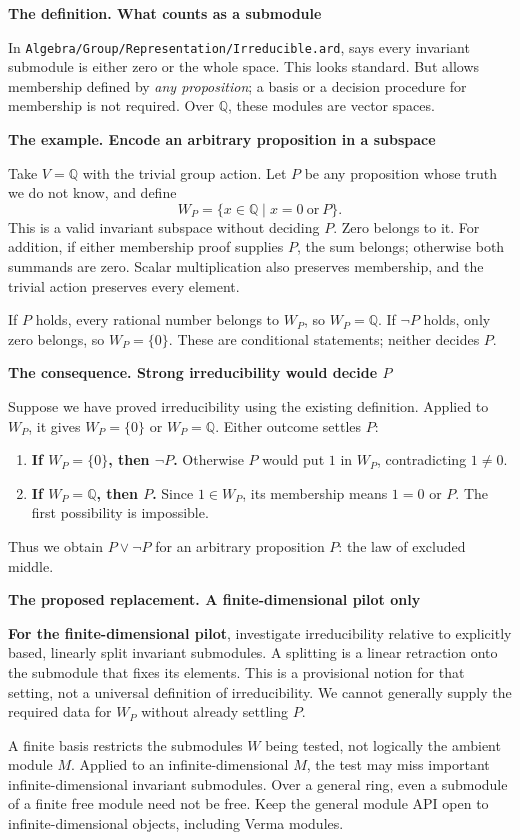 \documentclass[11pt,a4paper]{article}
\newcommand{\code}[1]{\texttt{\detokenize{#1}}}
\newcommand{\src}[1]{{\footnotesize\nolinkurl{#1}}}
\newcommand{\Q}{\mathbb Q}
\newcommand{\stage}[2]{\par\textbf{#1. #2}\par}
\begin{document}
\stage{The definition}{What counts as a submodule}
In \src{Algebra/Group/Representation/Irreducible.ard},
\code{IsIrreducible} says every invariant submodule is either zero or the
whole space. This looks standard. But \code{SubLRepres} allows membership
defined by \emph{any proposition}; a basis or a decision procedure for
membership is not required. Over $\Q$, these modules are vector spaces.

\stage{The example}{Encode an arbitrary proposition in a subspace}
Take $V=\Q$ with the trivial group action. Let $P$ be any proposition whose
truth we do not know, and define
\[
 W_P=\{x\in\Q\mid x=0\ \text{or}\ P\}.
\]
This is a valid invariant subspace without deciding $P$. Zero belongs to it.
For addition, if either membership proof supplies $P$, the sum belongs;
otherwise both summands are zero. Scalar multiplication also preserves
membership, and the trivial action preserves every element.

If $P$ holds, every rational number belongs to $W_P$, so $W_P=\Q$.
If $\neg P$ holds, only zero belongs, so $W_P=\{0\}$. These are conditional
statements; neither decides $P$.

\stage{The consequence}{Strong irreducibility would decide $P$}
Suppose we have proved irreducibility using the existing definition.
Applied to $W_P$, it gives $W_P=\{0\}$ or $W_P=\Q$. Either outcome settles $P$:
\begin{enumerate}
  \item \textbf{If $W_P=\{0\}$, then $\neg P$.} Otherwise $P$ would put $1$
  in $W_P$, contradicting $1\ne0$.
  \item \textbf{If $W_P=\Q$, then $P$.} Since $1\in W_P$, its membership
  means $1=0$ or $P$. The first possibility is impossible.
\end{enumerate}
Thus we obtain $P\lor\neg P$ for an arbitrary proposition $P$:
the law of excluded middle.

\stage{The proposed replacement}{A finite-dimensional pilot only}
\textbf{For the finite-dimensional pilot}, investigate irreducibility relative
to explicitly based, linearly split invariant submodules. A splitting is a
linear retraction onto the submodule that fixes its elements. This is a
provisional notion for that setting, not a universal definition of
irreducibility. We cannot generally supply the required data for $W_P$
without already settling $P$.

A finite basis restricts the submodules $W$ being tested, not logically the
ambient module $M$. Applied to an infinite-dimensional $M$, the test may miss
important infinite-dimensional invariant submodules. Over a general ring,
even a submodule of a finite free module need not be free. Keep the general
module API open to infinite-dimensional objects, including Verma modules.
\end{document}
